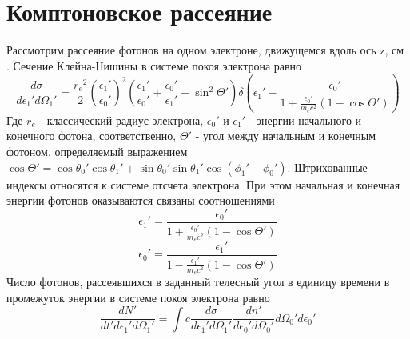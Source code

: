 \section{Комптоновское рассеяние}
Рассмотрим рассеяние фотонов на одном электроне, движущемся вдоль ось z, см \cite{Dubus}. Сечение Клейна-Нишины в системе покоя электрона равно
\begin{equation}
	\frac{d\sigma}{d\epsilon_1'd\Omega_1'}=\frac{{r_e}^2}{2}\left(\frac{\epsilon_1'}{\epsilon_0'}\right)^2(\frac{\epsilon_1'}{\epsilon_0'}+\frac{\epsilon_0'}{\epsilon_1'}-\sin^2\Theta') \delta(\epsilon_1' - \frac{\epsilon_0'}{1+\frac{\epsilon_0'}{m_e c^2}(1 - \cos \Theta')})
\end{equation}
Где $r_e$ - классический радиус электрона, $\epsilon_0'$ и $\epsilon_1'$ - энергии начального и конечного фотона, соответственно, $\Theta'$ - угол между начальным и конечным фотоном, определяемый выражением $\cos\Theta' =\cos \theta_0' \cos \theta_1' + \sin \theta_0' \sin \theta_1' \cos(\phi_1' - \phi_0')$. Штрихованные индексы относятся к системе отсчета электрона. При этом начальная и конечная энергии фотонов оказываются связаны соотношениями
\begin{equation}
	\epsilon_1'=\frac{\epsilon_0'}{1+\frac{\epsilon_0'}{m_e c^2}(1 - \cos \Theta')}	
\end{equation}
\begin{equation}
	\epsilon_0'=\frac{\epsilon_1'}{1-\frac{\epsilon_1'}{m_e c^2}(1 - \cos \Theta')}
\end{equation}
Число фотонов, рассеявшихся в заданный телесный угол в единицу времени в промежуток энергии в системе покоя электрона равно
\begin{equation}
\frac{dN'}{dt'd\epsilon_1'd\Omega_1'}=\int c \frac{d\sigma}{d\epsilon_1'd\Omega_1'} \frac{dn'}{d\epsilon_0'd\Omega_0'}d\Omega_0'd\epsilon_0'
\end{equation}

